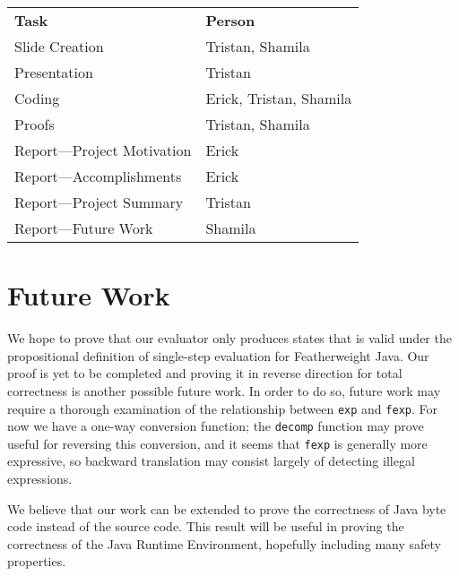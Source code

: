 \documentclass{article}
\begin{document}
\begin{tabular}{l|l}
\textbf{Task}         & \textbf{Person}  \\  \cline{1-2}
Slide Creation   &    Tristan, Shamila     \\
Presentation &   Tristan    \\
Coding           & Erick, Tristan, Shamila      \\
Proofs		& Tristan, Shamila \\ 
Report---Project Motivation    &     Erick  \\
Report---Accomplishments                &   Erick  \\
Report---Project Summary     &   Tristan        \\
Report---Future Work    &    Shamila      \\                 
\end{tabular}

\section{Future Work}

We hope to prove that our evaluator only produces states that is valid under the propositional definition of single-step evaluation for Featherweight Java. Our proof is yet to be completed and proving it in reverse direction for total correctness is another possible future work. In order to do so, future work may require a thorough examination of the relationship between \texttt{exp} and \texttt{fexp}. For now we have a one-way conversion function; the \texttt{decomp} function may prove useful for reversing this conversion, and it seems that \texttt{fexp} is generally more expressive, so backward translation may consist largely of detecting illegal expressions.

We believe that our work can be extended to prove the correctness of Java byte code instead of the source code. This result will be useful in proving the correctness of the Java Runtime Environment, hopefully including many safety properties.

{}

\end{document}
